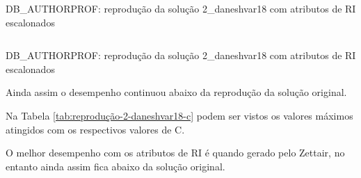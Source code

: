 \documentclass[%
  10pt,%
  aspectratio = 169,%
  compress,%
  t,%
]{beamer}%
\begin{document}
    \begin{frame}{}{DB\_AUTHORPROF: reprodução da solução 2\_daneshvar18 com atributos de RI escalonados}
        \begin{columns}[T]
                \vspace{-0.5cm}
                
                \vspace{-0.5cm}
                
        \end{columns}
    \end{frame}

    \begin{frame}{}{DB\_AUTHORPROF: reprodução da solução 2\_daneshvar18 com atributos de RI escalonados}
        
        Ainda assim o desempenho continuou abaixo da reprodução da solução original.

        Na Tabela \ref{tab:reprodução-2-daneshvar18-c} podem ser vistos os valores máximos atingidos com os respectivos valores de C.
        
        

        O melhor desempenho com os atributos de RI é quando gerado pelo Zettair, no entanto ainda assim fica abaixo da solução original.
    \end{frame}
\end{document}
